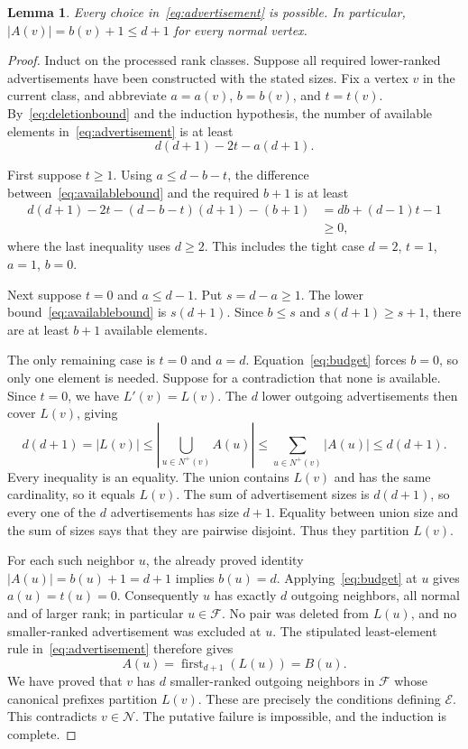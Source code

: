 \documentclass[11pt,a4paper]{article}
\numberwithin{equation}{section}
\newtheorem{lemma}[theorem]{Lemma}
\newcommand{\Nout}{N^{+}}
\newcommand{\full}{\mathcal F}
\newcommand{\exc}{\mathcal E}
\newcommand{\normal}{\mathcal N}
\newcommand{\first}{\operatorname{first}}
\begin{document}
\begin{lemma}
\label{lem:availability}
Every choice in~\eqref{eq:advertisement} is possible.
In particular, \(|A(v)|=b(v)+1\leq d+1\) for every normal vertex.
\end{lemma}
\begin{proof}
Induct on the processed rank classes. Suppose all required
lower-ranked advertisements have been constructed with the stated
sizes. Fix a vertex \(v\) in the current class, and abbreviate
\(a=a(v)\), \(b=b(v)\), and \(t=t(v)\).
By~\eqref{eq:deletionbound} and the induction hypothesis, the
number of available elements in~\eqref{eq:advertisement} is at least
\begin{equation}
 d(d+1)-2t-a(d+1).
 \label{eq:availablebound}
\end{equation}

First suppose \(t\geq1\). Using \(a\leq d-b-t\), the difference
between~\eqref{eq:availablebound} and the required \(b+1\) is at least
\[
\begin{split}
 d(d+1)-2t-(d-b-t)(d+1)-(b+1)
   &=db+(d-1)t-1\\
   &\geq0,
\end{split}
\]
where the last inequality uses \(d\geq2\).
This includes the tight case \(d=2\), \(t=1\), \(a=1\), \(b=0\).

Next suppose \(t=0\) and \(a\leq d-1\). Put \(s=d-a\geq1\).
The lower bound~\eqref{eq:availablebound} is \(s(d+1)\).
Since \(b\leq s\) and \(s(d+1)\geq s+1\), there are at least \(b+1\)
available elements.

The only remaining case is \(t=0\) and \(a=d\).
Equation~\eqref{eq:budget} forces \(b=0\), so only one element is
needed. Suppose for a contradiction that none is available.
Since \(t=0\), we have \(L'(v)=L(v)\). The \(d\) lower outgoing
advertisements then cover \(L(v)\), giving
\begin{equation}
 d(d+1)=|L(v)|
 \leq
 \left|\bigcup_{u\in\Nout(v)}A(u)\right|
 \leq
 \sum_{u\in\Nout(v)}|A(u)|
 \leq d(d+1).
 \label{eq:saturation}
\end{equation}
Every inequality is an equality. The union contains \(L(v)\)
and has the same cardinality, so it equals \(L(v)\).
The sum of advertisement sizes is \(d(d+1)\), so every one of
the \(d\) advertisements has size \(d+1\).
Equality between union size and the sum of sizes
says that they are pairwise disjoint. Thus they partition \(L(v)\).

For each such neighbor \(u\), the already proved identity
\(|A(u)|=b(u)+1=d+1\) implies \(b(u)=d\).
Applying~\eqref{eq:budget} at \(u\) gives \(a(u)=t(u)=0\).
Consequently \(u\) has exactly \(d\) outgoing neighbors, all normal
and of larger rank; in particular \(u\in\full\).
No pair was deleted from \(L(u)\), and no smaller-ranked
advertisement was excluded at \(u\).
The stipulated least-element rule in~\eqref{eq:advertisement}
therefore gives
\[
 A(u)=\first_{d+1}(L(u))=B(u).
\]
We have proved that \(v\) has \(d\) smaller-ranked outgoing
neighbors in \(\full\) whose canonical prefixes partition \(L(v)\).
These are precisely the conditions defining \(\exc\).
This contradicts \(v\in\normal\).
The putative failure is impossible, and the induction is complete.
\end{proof}
\end{document}
